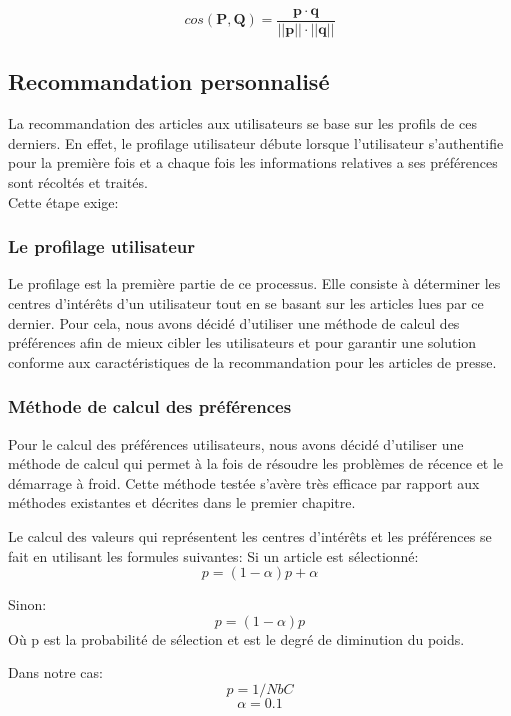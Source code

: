             \[cos(\pmb P, \pmb Q) = \frac {\pmb p \cdot \pmb q}{||\pmb p|| \cdot ||\pmb q||}\]


\subsection{Recommandation personnalisé}
La recommandation des articles aux utilisateurs se base sur les profils de ces derniers. En effet, le profilage utilisateur débute lorsque l'utilisateur s'authentifie pour la première fois et a chaque fois les informations relatives a ses préférences sont récoltés et traités.\\
Cette étape exige:

\subsubsection{Le profilage utilisateur}
Le profilage est la première partie de ce processus. Elle consiste à déterminer les centres d'intérêts d'un utilisateur tout en se basant sur les articles lues par ce dernier. Pour cela, nous avons décidé d'utiliser une méthode de calcul des préférences afin de mieux cibler les utilisateurs et pour garantir une solution conforme aux caractéristiques de la recommandation pour les articles de presse.

\subsubsection{Méthode de calcul des préférences}
Pour le calcul des préférences utilisateurs, nous avons décidé d'utiliser une méthode de calcul qui permet à la fois de résoudre les problèmes de récence et le démarrage à froid. Cette méthode testée s'avère très efficace par rapport aux méthodes existantes et décrites dans le premier chapitre.

Le calcul des valeurs qui représentent les centres d’intérêts et les préférences se fait en utilisant les formules suivantes: 
    Si un article est sélectionné:
                                   \[p = (1-{\alpha}) {p} + {\alpha}\]

    Sinon: 
                                     \[{p} = (1-{\alpha}) {p}\]
Où p est la probabilité de sélection et \alpha  est le degré de diminution du poids.

Dans notre cas:
                                   \[p = 1/{NbC}\]
                                   \[\alpha = 0.1\]

